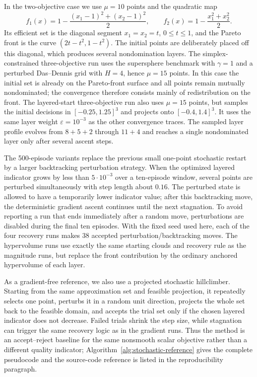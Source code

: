 \documentclass{article}
\begin{document}
In the two-objective case we use $\mu=10$ points and the quadratic map
\[
 f_1(x)=1-\frac{(x_1-1)^2+(x_2-1)^2}{2},\qquad
 f_2(x)=1-\frac{x_1^2+x_2^2}{2}.
\]
Its efficient set is the diagonal segment $x_1=x_2=t$, $0\le t\le 1$, and the Pareto front is the curve $(2t-t^2,1-t^2)$.  The initial points are deliberately placed off this diagonal, which produces several nondomination layers.  The simplex-constrained three-objective run uses the supersphere benchmark with $\gamma=1$ and a perturbed Das--Dennis grid with $H=4$, hence $\mu=15$ points.  In this case the initial set is already on the Pareto-front surface and all points remain mutually nondominated; the convergence therefore consists mainly of redistribution on the front.  The layered-start three-objective run also uses $\mu=15$ points, but samples the initial decisions in $[-0.25,1.25]^3$ and projects onto $[-0.4,1.4]^3$.  It uses the same layer weight $\varepsilon=10^{-3}$ as the other convergence traces.  The sampled layer profile evolves from $8+5+2$ through $11+4$ and reaches a single nondominated layer only after several ascent steps.

The 500-episode variants replace the previous small one-point stochastic restart by a larger backtracking perturbation strategy.  When the optimized layered indicator grows by less than $5\cdot 10^{-3}$ over a ten-episode window, several points are perturbed simultaneously with step length about $0.16$.  The perturbed state is allowed to have a temporarily lower indicator value; after this backtracking move, the deterministic gradient ascent continues until the next stagnation.  To avoid reporting a run that ends immediately after a random move, perturbations are disabled during the final ten episodes.  With the fixed seed used here, each of the four recovery runs makes $38$ accepted perturbation/backtracking moves.  The hypervolume runs use exactly the same starting clouds and recovery rule as the magnitude runs, but replace the front contribution by the ordinary anchored hypervolume of each layer.

As a gradient-free reference, we also use a projected stochastic hillclimber.  Starting from the same approximation set and feasible projection, it repeatedly selects one point, perturbs it in a random unit direction, projects the whole set back to the feasible domain, and accepts the trial set only if the chosen layered indicator does not decrease.  Failed trials shrink the step size, while stagnation can trigger the same recovery logic as in the gradient runs.  Thus the method is an accept--reject baseline for the same nonsmooth scalar objective rather than a different quality indicator; Algorithm~\ref{alg:stochastic-reference} gives the complete pseudocode and the source-code reference is listed in the reproducibility paragraph.
\end{document}
